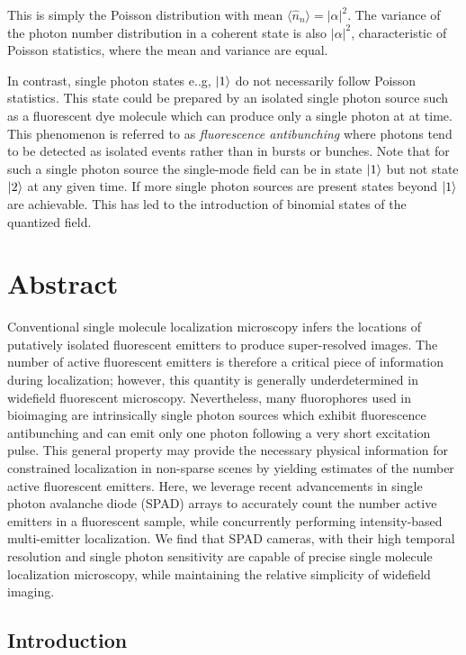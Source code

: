 This is simply the Poisson distribution with mean $\langle \hat{n}_n \rangle = \lvert\alpha\lvert^2$. The variance of the photon number distribution in a coherent state is also $\lvert\alpha\lvert^2$, characteristic of Poisson statistics, where the mean and variance are equal. 

In contrast, single photon states e..g, $\ket{1}$ do not necessarily follow Poisson statistics. This state could be prepared by an isolated single photon source such as a fluorescent dye molecule which can produce only a single photon at at time. This phenomenon is referred to as \emph{fluorescence antibunching} where photons tend to be detected as isolated events rather than in bursts or bunches. Note that for such a single photon source the single-mode field can be in state $\ket{1}$ but not state $\ket{2}$ at any given time. If more single photon sources are present states beyond $\ket{1}$ are achievable. This has led to the introduction of binomial states of the quantized field.



\section{Abstract}

Conventional single molecule localization microscopy infers the locations of putatively isolated fluorescent emitters to produce super-resolved images. The number of active fluorescent emitters is therefore a critical piece of information during localization; however, this quantity is generally underdetermined in widefield fluorescent microscopy. Nevertheless, many fluorophores used in bioimaging are intrinsically single photon sources which exhibit fluorescence antibunching and can emit only one photon following a very short excitation pulse. This general property may provide the necessary physical information for constrained localization in non-sparse scenes by yielding estimates of the number active fluorescent emitters. Here, we leverage recent advancements in single photon avalanche diode (SPAD) arrays to accurately count the number active emitters in a fluorescent sample, while concurrently performing intensity-based multi-emitter localization. We find that SPAD cameras, with their high temporal resolution and single photon sensitivity are capable of precise single molecule localization microscopy, while maintaining the relative simplicity of widefield imaging. 

\subsection{Introduction}

